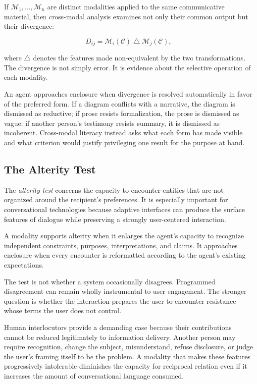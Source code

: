 \documentclass[11pt]{article}
\newcommand{\term}[1]{\emph{#1}}
\newcommand{\modality}{\mathcal{M}}
\newcommand{\contentobj}{\mathcal{C}}
\begin{document}
If \(\modality_1,\ldots,\modality_n\) are distinct modalities applied to the
same communicative material, then cross-modal analysis examines not only their
common output but their divergence:

\begin{equation}
  D_{ij}
  =
  \modality_i(\contentobj)
  \mathbin{\triangle}
  \modality_j(\contentobj),
  \label{eq:cross-modal-divergence}
\end{equation}

where \(\triangle\) denotes the features made non-equivalent by the two
transformations. The divergence is not simply error. It is evidence about the
selective operation of each modality.

An agent approaches enclosure when divergence is resolved automatically in
favor of the preferred form. If a diagram conflicts with a narrative, the
diagram is dismissed as reductive; if prose resists formalization, the prose
is dismissed as vague; if another person's testimony resists summary, it is
dismissed as incoherent. Cross-modal literacy instead asks what each form has
made visible and what criterion would justify privileging one result for the
purpose at hand.

\subsection{The Alterity Test}

The \term{alterity test} concerns the capacity to encounter entities that are
not organized around the recipient's preferences. It is especially important
for conversational technologies because adaptive interfaces can produce the
surface features of dialogue while preserving a strongly user-centered
interaction.

A modality supports alterity when it enlarges the agent's capacity to
recognize independent constraints, purposes, interpretations, and claims. It
approaches enclosure when every encounter is reformatted according to the
agent's existing expectations.

The test is not whether a system occasionally disagrees. Programmed
disagreement can remain wholly instrumental to user engagement. The stronger
question is whether the interaction prepares the user to encounter resistance
whose terms the user does not control.

Human interlocutors provide a demanding case because their contributions
cannot be reduced legitimately to information delivery. Another person may
require recognition, change the subject, misunderstand, refuse disclosure, or
judge the user's framing itself to be the problem. A modality that makes these
features progressively intolerable diminishes the capacity for reciprocal
relation even if it increases the amount of conversational language consumed.
\end{document}
